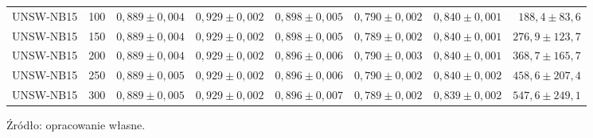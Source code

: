\begin{table}[H]
{\begin{tabular}{llrrrrrr}
UNSW-NB15 & 100 & $0{,}889 \pm 0{,}004$ & $0{,}929 \pm 0{,}002$ & $0{,}898 \pm 0{,}005$ & $0{,}790 \pm 0{,}002$ & $0{,}840 \pm 0{,}001$ & $188{,}4 \pm 83{,}6$ \\
UNSW-NB15 & 150 & $0{,}889 \pm 0{,}004$ & $0{,}929 \pm 0{,}002$ & $0{,}898 \pm 0{,}005$ & $0{,}789 \pm 0{,}002$ & $0{,}840 \pm 0{,}001$ & $276{,}9 \pm 123{,}7$ \\
UNSW-NB15 & 200 & $0{,}889 \pm 0{,}004$ & $0{,}929 \pm 0{,}002$ & $0{,}896 \pm 0{,}006$ & $0{,}790 \pm 0{,}003$ & $0{,}840 \pm 0{,}001$ & $368{,}7 \pm 165{,}7$ \\
UNSW-NB15 & 250 & $0{,}889 \pm 0{,}005$ & $0{,}929 \pm 0{,}002$ & $0{,}896 \pm 0{,}006$ & $0{,}790 \pm 0{,}002$ & $0{,}840 \pm 0{,}002$ & $458{,}6 \pm 207{,}4$ \\
UNSW-NB15 & 300 & $0{,}889 \pm 0{,}005$ & $0{,}929 \pm 0{,}002$ & $0{,}896 \pm 0{,}007$ & $0{,}789 \pm 0{,}002$ & $0{,}839 \pm 0{,}002$ & $547{,}6 \pm 249{,}1$ \\
\hline
\end{tabular}}
\end{table}

Źródło: opracowanie własne.